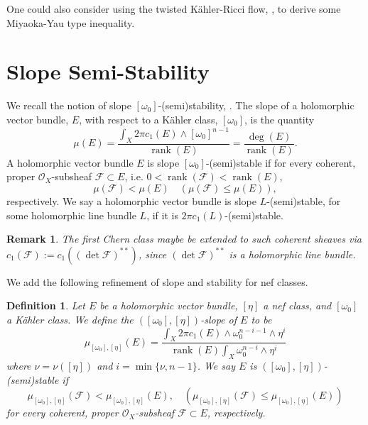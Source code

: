 \documentclass[12pt]{article}
\newtheorem{definition}[theorem]{Definition}
\newtheorem{remark}[theorem]{Remark}
\numberwithin{equation}{section}
\newcommand{\OO}{\mathcal{O}}
\DeclareMathOperator{\rank}{rank}
\begin{document}
\noindent One could also consider using the twisted K\"ahler-Ricci flow, \cite{L13}, to derive some Miyaoka-Yau type inequality.

\section{Slope Semi-Stability}

\noindent We recall the notion of slope $[\omega_0]$-(semi)stability, \cite{UY86,K14}. The slope of a holomorphic vector bundle, $E$, with respect to a K\"ahler class, $[\omega_0]$, is the quantity
\begin{equation*}
    \mu(E) = \frac{\int_X 2\pi c_1(E) \wedge [\omega_0]^{n-1}}{ \rank (E)} = \frac{\deg(E)}{\rank(E)}.
\end{equation*}
A holomorphic vector bundle $E$ is slope $[\omega_0]$-(semi)stable if for every coherent, proper $\OO_X$-subsheaf $\mathcal{F} \subset E$, i.e. $0 < \rank(\mathcal{F}) < \rank(E)$, 
\begin{equation*}
    \mu(\mathcal{F}) < \mu(E) \quad (\mu(\mathcal{F}) \leq \mu(E)),
\end{equation*}
respectively. We say a holomorphic vector bundle is slope $L$-(semi)stable, for some holomorphic line bundle $L$, if it is $2\pi c_1(L)$-(semi)stable.

\begin{remark}
The first Chern class maybe be extended to such coherent sheaves via $c_1(\mathcal{F}) := c_1((\det \mathcal{F})^{**})$, since $(\det \mathcal{F})^{**}$ is a holomorphic line bundle.
\end{remark}

\noindent We add the following refinement of slope and stability for nef classes.

\begin{definition}\label{normalized_slope}
Let $E$ be a holomorphic vector bundle, $[\eta]$ a nef class, and $[\omega_0]$ a K\"ahler class. We define the $([\omega_0], [\eta])$-slope of $E$ to be
\begin{equation*}
    \mu_{[\omega_0],[\eta]}(E) = \frac{\int_X 2 \pi c_1(E) \wedge \omega_0^{n-i-1} \wedge \eta^{i}}{\rank(E) \int_X \omega_0^{n-i} \wedge \eta^{i}}
\end{equation*}
where $\nu = \nu([\eta])$ and $i = \min\{\nu, n-1\}$. We say $E$ is $([\omega_0], [\eta])$-(semi)stable if
\begin{equation*}
    \mu_{[\omega_0],[\eta]}(\mathcal{F}) < \mu_{[\omega_0],[\eta]}(E), \quad (\mu_{[\omega_0],[\eta]}(\mathcal{F}) \leq \mu_{[\omega_0],[\eta]}(E))
\end{equation*}
for every coherent, proper $\OO_X$-subsheaf $\mathcal{F}\subset E$, respectively.
\end{definition}
\end{document}
